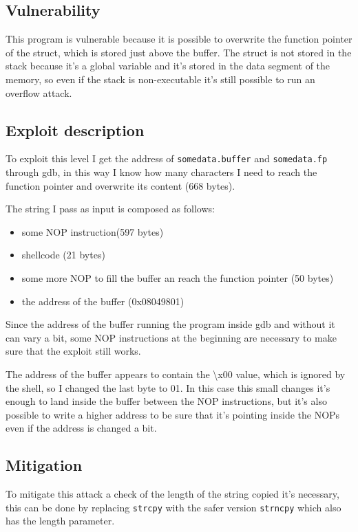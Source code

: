 \documentclass[a4paper,12pt]{article}
\begin{document}
\subsection{Vulnerability}

This program is vulnerable because it is possible to overwrite the function pointer of the struct, which is stored just above the buffer. The struct is not stored in the stack because it's a global variable and it's stored in the data segment of the memory, so even if the stack is non-executable it's still possible to run an overflow attack.


\subsection{Exploit description}

To exploit this level I get the address of \texttt{somedata.buffer} and \texttt{somedata.fp} through gdb, in this way I know how many characters I need to reach the function pointer and overwrite its content (668 bytes).

The string I pass as input is composed as follows:

\begin{itemize}
\item some NOP instruction(597 bytes)
\item shellcode (21 bytes)
\item some more NOP to fill the buffer an reach the function pointer (50 bytes)
\item the address of the buffer (0x08049801)
\end{itemize}

Since the address of the buffer running the program inside gdb and without it can vary a bit, some NOP instructions at the beginning are necessary to make sure that the exploit still works.

The address of the buffer appears to contain the \textbackslash x00 value, which is ignored by the shell, so I changed the last byte to 01. In this case this small changes it's enough to land inside the buffer between the NOP instructions, but it's also possible to write a higher address to be sure that it's pointing inside the NOPs even if the address is changed a bit.  

\subsection{Mitigation}

To mitigate this attack a check of the length of the string copied it's necessary, this can be done by replacing \texttt{strcpy} with the safer version \texttt{strncpy} which also has the length parameter.
\end{document}
